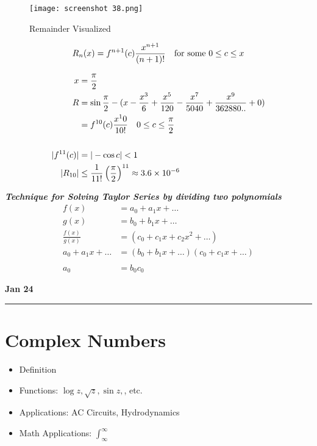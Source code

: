 \documentclass[svgnames]{article}   	%
\begin{document}
\begin{figure}[htb!]
  \centering
    \texttt{[image: screenshot 38.png]}
    \caption{Remainder Visualized}
\end{figure}



\begin{tcolorbox}[colback = blue!5!white, colframe = blue!50!black, title
  = Remainder Theorem]
 \[ 
  R_n(x) = f^{n+1} (c) \frac{x^{n+1}}{(n+1)!} \hspace{10px} \text{for some $0
  \leq c \leq x$}
\]
\end{tcolorbox}

\begin{tcolorbox}	
  
  \begin{align*}
    x &= \frac{\pi}{2} \\ 
    R &= \sin \frac{\pi}{2} - (x - \frac{x^3}{6} + \frac{x^5}{120}
    - \frac{x^7}{5040} + \frac{x^9}{362880..} + 0 ) \\
      &= f^{10}(c)\frac{x^10}{10!} \hspace{10px} 0 \leq c \leq \frac{\pi}{2}
      \\\\
    |f^{11} (c) | &= | -\cos c| < 1 \\
    |R_{10}| &\leq \frac{1}{11!} \left(\frac{\pi}{2}\right)^{11} \approx 3.6
    \times 10^{-6}
  \end{align*}

\end{tcolorbox}	
\newpage
\textbf{ \textit{Technique for Solving Taylor Series by dividing two
polynomials}}
\begin{align*}
f(x) &= a_0 + a_1x + \dots  \\
g(x) &= b_0 + b_1x + \dots \\
\frac{f(x)}{g(x)} &= (c_0 + c_1x +c_2x^2 + \dots) \\
a_0 + a_1x + \dots &= (b_0 + b_1x + \dots)(c_0 + c_1x + \dots)  \\\\
a_0 &= b_0c_0
\end{align*}

\newpage
\noindent \textbf{Jan 24} \hrule
\vspace{10px} 
\section{Complex Numbers}

\begin{itemize}
  \item Definition
  \item Functions: $\log z, \sqrt{z}, \sin z,$, etc.
  \item Applications: AC Circuits, Hydrodynamics
  \item Math Applications: $\int_{\infty}^{\infty}$
\end{itemize}
\end{document}
